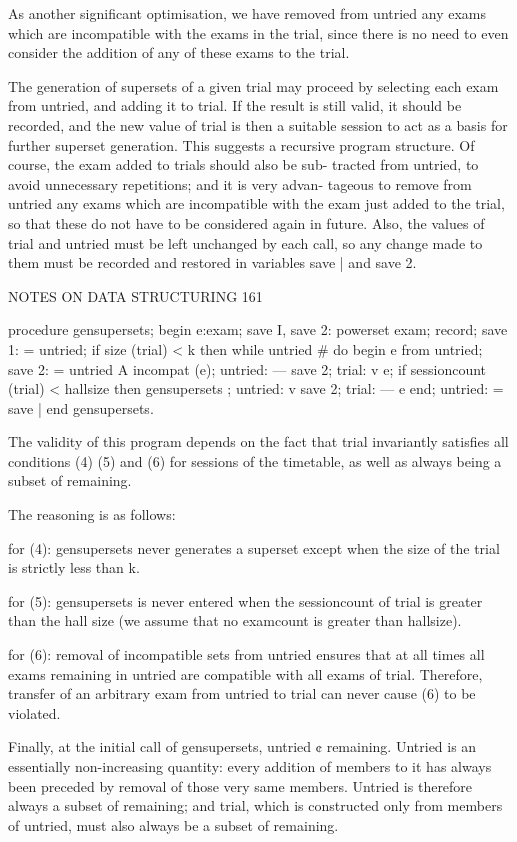 As another significant optimisation, we have removed from untried any exams which are incompatible with the exams in the trial, since there is no need to even consider the addition of any of these exams to the trial.

The generation of supersets of a given trial may proceed by selecting each exam from untried, and adding it to trial. If the result is still valid, it should be recorded, and the new value of trial is then a suitable session to act as a basis for further superset generation. This suggests a recursive program structure. Of course, the exam added to trials should also be sub- tracted from untried, to avoid unnecessary repetitions; and it is very advan- tageous to remove from untried any exams which are incompatible with the exam just added to the trial, so that these do not have to be considered again in future. Also, the values of trial and untried must be left unchanged by each call, so any change made to them must be recorded and restored in variables save | and save 2.

NOTES ON DATA STRUCTURING 161

procedure gensupersets; begin e:exam; save I, save 2: powerset exam; record; save 1: = untried; if size (trial) < k then while untried # { }do begin e from untried; save 2: = untried A incompat (e); untried: — save 2; trial: v {e}; if sessioncount (trial) < hallsize then gensupersets ; untried: v save 2; trial: — {e} end; untried: = save | end gensupersets.

The validity of this program depends on the fact that trial invariantly satisfies all conditions (4) (5) and (6) for sessions of the timetable, as well as always being a subset of remaining.

The reasoning is as follows:

for (4): gensupersets never generates a superset except when the size of the trial is strictly less than k.

for (5): gensupersets is never entered when the sessioncount of trial is greater than the hall size (we assume that no examcount is greater than hallsize).

for (6): removal of incompatible sets from untried ensures that at all times all exams remaining in untried are compatible with all exams of trial. Therefore, transfer of an arbitrary exam from untried to trial can never cause (6) to be violated.

Finally, at the initial call of gensupersets, untried ¢ remaining. Untried is an essentially non-increasing quantity: every addition of members to it has always been preceded by removal of those very same members. Untried is therefore always a subset of remaining; and trial, which is constructed only from members of untried, must also always be a subset of remaining.

